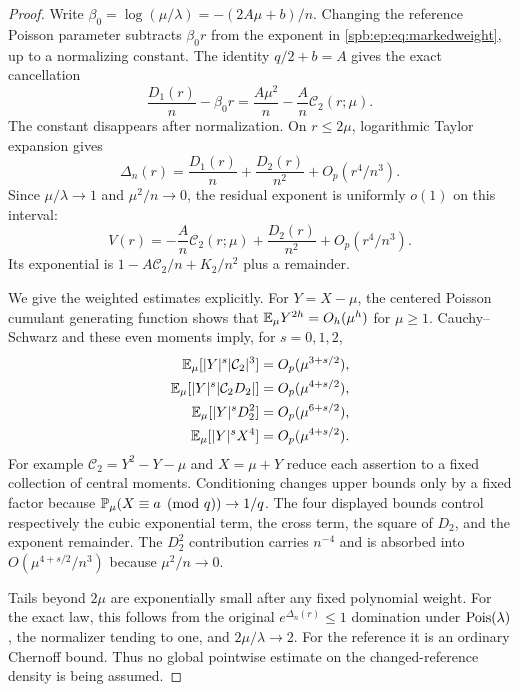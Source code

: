 \begin{proof}
Write $\beta_0=\log(\mu/\lambda)=-(2A\mu+b)/n$.
Changing the reference Poisson parameter subtracts $\beta_0r$ from the
exponent in \eqref{spb:ep:eq:markedweight}, up to a normalizing constant.
The identity $q/2+b=A$ gives the exact cancellation
\begin{equation}\label{spb:ep:eq:cancel}
 \frac{D_1(r)}n-\beta_0r
       =\frac{A\mu^2}{n}-\frac A n\mathcal C_2(r;\mu).
\end{equation}
The constant disappears after normalization. On $r\le2\mu$, logarithmic
Taylor expansion gives
\[
 \Delta_n(r)=\frac{D_1(r)}n+\frac{D_2(r)}{n^2}
                                  +O_p(r^4/n^3).
\]
Since $\mu/\lambda\to1$ and $\mu^2/n\to0$, the residual exponent is
uniformly $o(1)$ on this interval:
\begin{equation}\label{spb:ep:eq:residualV}
 V(r)=-\frac A n\mathcal C_2(r;\mu)
              +\frac{D_2(r)}{n^2}+O_p(r^4/n^3).
\end{equation}
Its exponential is
$1-A\mathcal C_2/n+K_2/n^2$ plus a remainder.

We give the weighted estimates explicitly. For $Y=X-\mu$, the centered
Poisson cumulant generating function shows that
$\mathbb E_\mu Y^{2h}=O_h(\mu^h)$ for $\mu\ge1$.
Cauchy--Schwarz and these even moments imply, for $s=0,1,2$,
\begin{align*}
 \mathbb E_\mu[|Y|^s|\mathcal C_2|^3]&=O_p(\mu^{3+s/2}),\\
 \mathbb E_\mu[|Y|^s|\mathcal C_2D_2|]&=O_p(\mu^{4+s/2}),\\
 \mathbb E_\mu[|Y|^sD_2^2]&=O_p(\mu^{6+s/2}),\\
 \mathbb E_\mu[|Y|^sX^4]&=O_p(\mu^{4+s/2}).
\end{align*}
For example $\mathcal C_2=Y^2-Y-\mu$ and $X=\mu+Y$ reduce each assertion
to a fixed collection of central moments. Conditioning changes upper
bounds only by a fixed factor because
$\mathbb P_\mu(X\equiv a\pmod q)\to1/q$.
The four displayed bounds control respectively the cubic exponential
term, the cross term, the square of $D_2$, and the exponent remainder.
The $D_2^2$ contribution carries $n^{-4}$ and is absorbed into
$O(\mu^{4+s/2}/n^3)$ because $\mu^2/n\to0$.

Tails beyond $2\mu$ are exponentially small after any fixed polynomial
weight. For the exact law, this follows from the original
$e^{\Delta_n(r)}\le1$ domination under $\operatorname{Pois}(\lambda)$, the normalizer
tending to one, and $2\mu/\lambda\to2$.
For the reference it is an ordinary Chernoff bound.
Thus no global pointwise estimate on the changed-reference density is
being assumed.


\end{proof}
